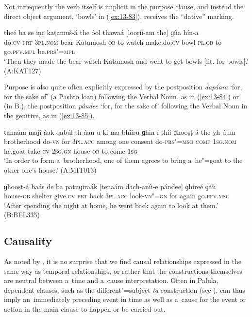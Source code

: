 Not infrequently the verb itself is implicit in the purpose clause, and instead the direct object argument, `bowls' in (\ref{ex:13-83}), receives the ``dative'' marking.

\begin{exe}
\ex
\label{ex:13-83}
\gll theé ba se iṇc̣ kaṭamuš-á the óol thawaá [looṛíi-am the] ɡíia hín-a \\
do.\textsc{cv} \textsc{prt} \textsc{3pl.nom} bear Katamosh-\textsc{ob} to watch  make.do.\textsc{cv} bowl-\textsc{pl.ob} to go.\textsc{pfv.mpl} be.\textsc{prs"=mpl} \\
\glt `Then they made the bear watch Katamosh and went to get bowls [lit. for bowls].' (A:KAT127) 
\end{exe}

Purpose is also quite often explicitly expressed by the postposition \textit{dapáara} `for, for the sake of' (a Pashto loan) following the Verbal Noun, as in (\ref{ex:13-84}) or (in B.), the postposition \textit{pándee} `for, for the sake of' following the Verbal Noun in the genitive, as in (\ref{ex:13-85}).

\begin{exe}
\ex
\label{ex:13-84}
\gll [bhraawéeli th"=ainií dapáara] tanaám maǰí áak qabúl th-áan-u ki ma bhíiru ɡhin-í thíi ɡhooṣṭ-á the yh-úum \\
brotherhood do-\textsc{vn} for \textsc{3pl.acc} among one consent do-\textsc{prs"=msg} \textsc{comp} \textsc{1sg.nom} he.goat take-\textsc{cv} \textsc{2sg.gn}  house-\textsc{ob} to come-\textsc{1sg} \\
\glt `In order to form a~brotherhood, one of them agrees to bring a~he"=goat to the other one's house.' (A:MIT013)

\ex
\label{ex:13-85}
\gll ɡhooṣṭ-á baás de ba patuɡiraák [tenaám dac̣h-aníi-e pándee] ɡhireé ɡáu \\
house-\textsc{ob}  shelter give.\textsc{cv} \textsc{prt} back \textsc{3pl.acc}  look-\textsc{vn"=gn} for again go.\textsc{pfv.msg} \\
\glt `After spending the night at home, he went back again to look at them.' (B:BEL335)
\end{exe}

\subsection{Causality}
\label{subsec:13-4-3}

As noted by \citet[247]{thompsonetal2007}, it is no surprise that we find causal relationships expressed in the same way as temporal relationships, or rather that the constructions themselves are neutral between a~time and a~cause interpretation. Often in Palula, dependent clauses, such as the different"=subject \textit{ta}-construction (see ), can thus imply an~immediately preceding event in time as well as a~cause for the event or action in the main clause to happen or be carried out. 



